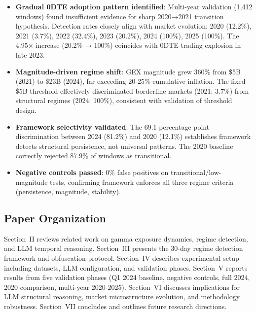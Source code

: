 \begin{itemize}
\item \textbf{Gradual 0DTE adoption pattern identified}: Multi-year validation (1,412 windows) found insufficient evidence for sharp 2020→2021 transition hypothesis. Detection rates closely align with market evolution: 2020 (12.2\%), 2021 (3.7\%), 2022 (32.4\%), 2023 (20.2\%), 2024 (100\%), 2025 (100\%). The 4.95× increase (20.2\% → 100\%) coincides with 0DTE trading explosion in late 2023.

\item \textbf{Magnitude-driven regime shift}: GEX magnitude grew 360\% from \$5B (2021) to \$23B (2024), far exceeding 20-25\% cumulative inflation. The fixed \$5B threshold effectively discriminated borderline markets (2021: 3.7\%) from structural regimes (2024: 100\%), consistent with validation of threshold design.

\item \textbf{Framework selectivity validated}: The 69.1 percentage point discrimination between 2024 (81.2\%) and 2020 (12.1\%) establishes framework detects structural persistence, not universal patterns. The 2020 baseline correctly rejected 87.9\% of windows as transitional.

\item \textbf{Negative controls passed}: 0\% false positives on transitional/low-magnitude tests, confirming framework enforces all three regime criteria (persistence, magnitude, stability).
\end{itemize}

\subsection{Paper Organization}

Section~II reviews related work on gamma exposure dynamics, regime detection, and LLM temporal reasoning. Section~III presents the 30-day regime detection framework and obfuscation protocol. Section~IV describes experimental setup including datasets, LLM configuration, and validation phases. Section~V reports results from five validation phases (Q1 2024 baseline, negative controls, full 2024, 2020 comparison, multi-year 2020-2025). Section~VI discusses implications for LLM structural reasoning, market microstructure evolution, and methodology robustness. Section~VII concludes and outlines future research directions.
